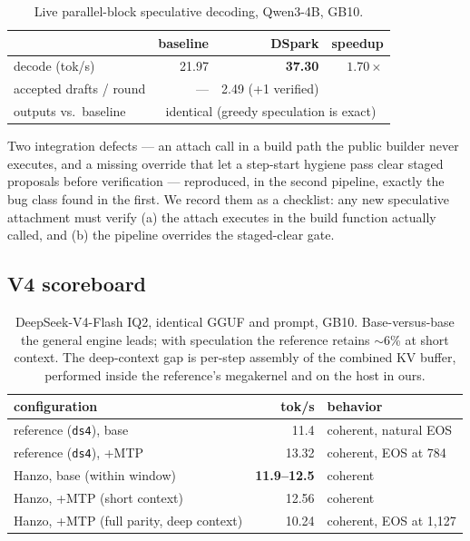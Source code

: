 \documentclass[11pt]{article}
\begin{document}
\begin{table}[h]
\centering
\begin{tabular}{lrrr}
\toprule
 & baseline & DSpark & speedup \\
\midrule
decode (tok/s) & 21.97 & \textbf{37.30} & $1.70\times$ \\
accepted drafts / round & --- & 2.49 (+1 verified) & \\
outputs vs.\ baseline & \multicolumn{3}{c}{identical (greedy speculation is exact)} \\
\bottomrule
\end{tabular}
\caption{Live parallel-block speculative decoding, Qwen3-4B, GB10.}
\end{table}

Two integration defects --- an attach call in a build path the public
builder never executes, and a missing override that let a step-start
hygiene pass clear staged proposals before verification --- reproduced,
in the second pipeline, exactly the bug class found in the first. We
record them as a checklist: any new speculative attachment must verify
(a) the attach executes in the build function actually called, and (b)
the pipeline overrides the staged-clear gate.

\subsection{V4 scoreboard}

\begin{table}[h]
\centering
\begin{tabular}{lrl}
\toprule
configuration & tok/s & behavior \\
\midrule
reference (\texttt{ds4}), base & 11.4 & coherent, natural EOS \\
reference (\texttt{ds4}), +MTP & 13.32 & coherent, EOS at 784 \\
\midrule
Hanzo, base (within window) & \textbf{11.9--12.5} & coherent \\
Hanzo, +MTP (short context) & 12.56 & coherent \\
Hanzo, +MTP (full parity, deep context) & 10.24 & coherent, EOS at 1{,}127 \\
\bottomrule
\end{tabular}
\caption{DeepSeek-V4-Flash IQ2, identical GGUF and prompt, GB10.
Base-versus-base the general engine leads; with speculation the
reference retains $\sim$6\% at short context. The deep-context gap is
per-step assembly of the combined KV buffer, performed inside the
reference's megakernel and on the host in ours.}
\end{table}
\end{document}
